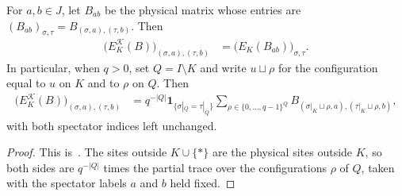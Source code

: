 \begin{lemma}
    \label{thm:qc_spectator_blocks}
    \leanok
    For $a,b\in J$, let $B_{ab}$ be the physical matrix whose entries are
    $(B_{ab})_{\sigma,\tau}=B_{(\sigma,a),(\tau,b)}$. Then
    \begin{align}
        \bigl(E_K^{\mathcal K}(B)\bigr)_{(\sigma,a),(\tau,b)}
         & =\bigl(E_K(B_{ab})\bigr)_{\sigma,\tau}.
        \label{eq:qc_spectator_blocks}
    \end{align}
    In particular, when $q>0$, set $Q=I\setminus K$ and write
    $u\sqcup\rho$ for the configuration equal to $u$ on $K$ and to
    $\rho$ on $Q$. Then
    \begin{align}
        \bigl(E_K^{\mathcal K}(B)\bigr)_{(\sigma,a),(\tau,b)}
         & =q^{-|Q|}\mathbf1_{\{\sigma|_Q=\tau|_Q\}}
        \sum_{\rho\in\{0,\ldots,q-1\}^{Q}}
        B_{(\sigma|_K\sqcup\rho,a),(\tau|_K\sqcup\rho,b)},
        \label{eq:qc_spectator_trace}
    \end{align}
    with both spectator indices left unchanged.
\end{lemma}
\begin{proof}
    \leanok
    This is~\cite[``Spectator blocks'']{QICLean2026Blueprint}.
    The sites outside $K\cup\{\ast\}$ are the physical sites outside $K$, so
    both sides are $q^{-|Q|}$ times the partial trace over the configurations
    $\rho$ of $Q$, taken with the spectator labels $a$ and $b$ held fixed.
\end{proof}

